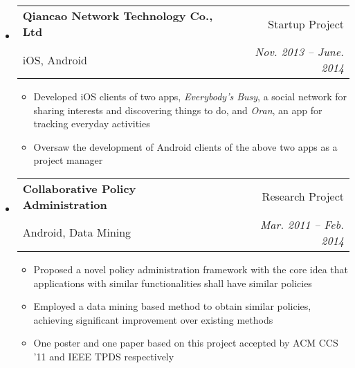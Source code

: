 \documentclass[letterpaper,10pt]{article}
\makeatletter
\newcommand{\resitem}[1]{\item #1 \vspace{-2pt}}
\newcommand{\resheading}[1]{{\large \colorbox{mygrey}{\begin{minipage}{\textwidth}{\textbf{#1 \vphantom{p\^{E}}}}\end{minipage}}}}
\newcommand{\ressubheading}[4]{
\begin{tabular*}{6.5in}{l@{\extracolsep{\fill}}r}
		\textbf{#1} & #2 \\
		#3 & #4 \\
\end{tabular*}\vspace{-6pt}}
\makeatother
\begin{document}
	\begin{itemize}
		\item
			\ressubheading{Qiancao Network Technology Co., Ltd}{Startup Project}{iOS, Android}{\emph{Nov. 2013 -- June. 2014}}
			{\begin{itemize}
				\resitem{Developed iOS clients of two apps, \emph{Everybody's Busy}, a social network for sharing interests and discovering things to do, and \emph{Oran}, an app for tracking everyday activities}
                \resitem{Oversaw the development of Android clients of the above two apps as a project manager}
			\end{itemize}
			}	
	\end{itemize}
	\begin{itemize}
		\item
			\ressubheading{Collaborative Policy Administration}{Research Project}{Android, Data Mining}{\emph{Mar. 2011 -- Feb. 2014}}
			{\begin{itemize}
				\resitem{Proposed a novel policy administration framework with the core idea that applications with similar functionalities shall have similar policies}
				\resitem{Employed a data mining based method to obtain similar policies, achieving significant improvement over existing methods}
				\resitem{One poster and one paper based on this project accepted by ACM CCS '11 and IEEE TPDS respectively}
			\end{itemize}
			}	
	\end{itemize}  %





\end{document}
